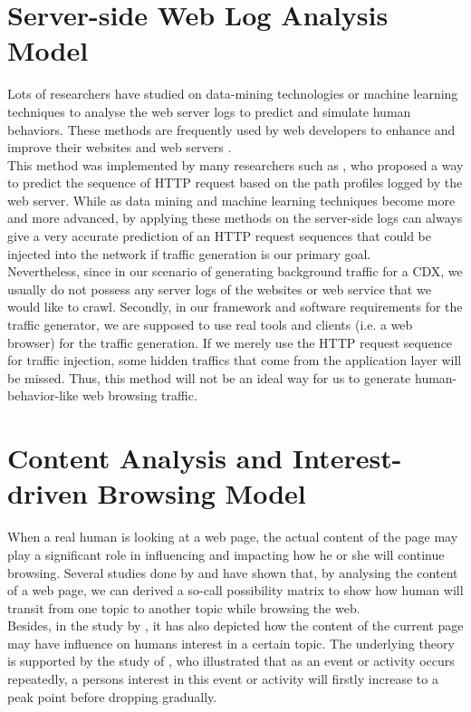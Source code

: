 \documentclass[12pt]{report}
\begin{document}
\section{Server-side Web Log Analysis Model}
Lots of researchers have studied on data-mining technologies or machine learning techniques to analyse the web server logs to predict and simulate human behaviors. These methods are frequently used by web developers to enhance and improve their websites and web servers \citep{mining} \citep{ml}.\\

This method was implemented by many researchers such as \citep{mining-imp}, who proposed a way to predict the sequence of HTTP request based on the path profiles logged by the web server. While as data mining and machine learning techniques become more and more advanced, by applying these methods on the server-side logs can always give a very accurate prediction of an HTTP request sequences that could be injected into the network if traffic generation is our primary goal.\\

Nevertheless, since in our scenario of generating background traffic for a CDX, we usually do not possess any server logs of the websites or web service that we would like to crawl. Secondly, in our framework and software requirements for the traffic generator, we are supposed to use real tools and clients (i.e. a web browser) for the traffic generation. If we merely use the HTTP request sequence for traffic injection, some hidden traffics that come from the application layer will be missed. Thus, this method will not be an ideal way for us to generate human-behavior-like web browsing traffic.


\section{Content Analysis and Interest-driven Browsing Model}
When a real human is looking at a web page, the actual content of the page may play a significant role in influencing and impacting how he or she will continue browsing. Several studies done by \citet{ca-res1} and \citet{ca-res2} have shown that, by analysing the content of a web page, we can derived a so-call possibility matrix to show how human will transit from one topic to another topic while browsing the web.\\

Besides, in the study by \citet{yang}, it has also depicted how the content of the current page may have influence on human\textquotesingle s interest in a certain topic. The underlying theory is supported by the study of \citet{interest-theo}, who illustrated that as an event or activity occurs repeatedly, a person\textquotesingle s interest in this event or activity will firstly increase to a peak point before dropping gradually. \\
\end{document}

